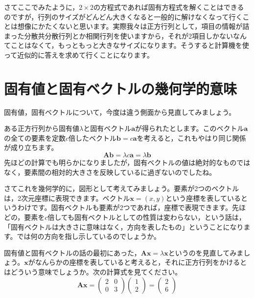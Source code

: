 \documentclass{ltjsbook}
\begin{document}
さてここでみたように，$2\times2$の方程式であれば固有方程式を解くことはできるのですが，行列のサイズがどんどん大きくなると一般的に解けなくなって行くことは想像にかたくないと思います。実際我々は正方行列として，項目の情報が詰まった分散共分散行列とか相関行列を使いますから，それが2項目しかないなんてことはなくて，もっともっと大きなサイズになります。そうすると計算機を使って近似的に答えを求めて行くことになります。

\section{固有値と固有ベクトルの幾何学的意味}

固有値，固有ベクトルについて，今度は違う側面から見直してみましょう。

ある正方行列から固有値$\lambda$と固有ベクトル$\bm{a}$が得られたとします。このベクトル$\bm{a}$の全ての要素を定数$c$倍したベクトル$\bm{b}=c\bm{a}$を考えると，これもやはり同じ関係が成り立ちます。
\begin{equation}
\bm{A}\bm{b}=  \lambda c \bm{a} =\lambda \bm{b}
\end{equation}
先ほどの計算でも明らかになりましたが，固有ベクトルの値は絶対的なものではなく，要素間の相対的大きさを反映しているに過ぎないのでしたね。

さてこれを幾何学的に，図形として考えてみましょう。要素が2つのベクトルは，2次元座標に表現できます。ベクトル$\bm{x}=(x,y)$という座標を表しているというわけです。固有ベクトルも要素が2つであれば，座標で表現できます。先ほどの，要素を$c$倍しても固有ベクトルとしての性質は変わらない，という話は，「固有ベクトルは大きさに意味はなく，方向を表したもの」ということになります。では何の方向を指し示しているのでしょうか。

固有値と固有ベクトルの話の最初にあった，$\bm{Ax}=\lambda\bm{x}$というのを見直してみましょう。$\bm{x}$がなんらかの座標を表していると考えると，それに正方行列をかけるとはどういう意味でしょうか。次の計算式を見てください。
\begin{equation}
    \bm{Ax}=
    \begin{pmatrix} 
    2 & 0 \\ 
    0 & 3 
    \end{pmatrix}
    \begin{pmatrix}
     1 \\
     2 
    \end{pmatrix} 
    =
    \begin{pmatrix}
    2 \\
     6
    \end{pmatrix}
\end{equation}
\end{document}
